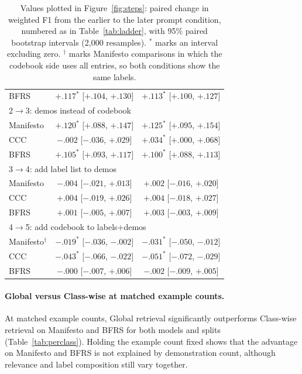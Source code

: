 \documentclass[11pt]{article}
\begin{document}
\begin{table}[!htp]
\begin{tabular}{lcc}
\quad BFRS & $+.117^*$ [$+.104$, $+.130$] & $+.113^*$ [$+.100$, $+.127$] \\
\multicolumn{3}{l}{2$\rightarrow$3: demos instead of codebook} \\
\quad Manifesto & $+.120^*$ [$+.088$, $+.147$] & $+.125^*$ [$+.095$, $+.154$] \\
\quad CCC & $-.002$ [$-.036$, $+.029$] & $+.034^*$ [$+.000$, $+.068$] \\
\quad BFRS & $+.105^*$ [$+.093$, $+.117$] & $+.100^*$ [$+.088$, $+.113$] \\
\multicolumn{3}{l}{3$\rightarrow$4: add label list to demos} \\
\quad Manifesto & $-.004$ [$-.021$, $+.013$] & $+.002$ [$-.016$, $+.020$] \\
\quad CCC & $+.004$ [$-.019$, $+.026$] & $+.004$ [$-.018$, $+.027$] \\
\quad BFRS & $+.001$ [$-.005$, $+.007$] & $+.003$ [$-.003$, $+.009$] \\
\multicolumn{3}{l}{4$\rightarrow$5: add codebook to labels+demos} \\
\quad Manifesto$^\dagger$ & $-.019^*$ [$-.036$, $-.002$] & $-.031^*$ [$-.050$, $-.012$] \\
\quad CCC & $-.043^*$ [$-.066$, $-.022$] & $-.051^*$ [$-.072$, $-.029$] \\
\quad BFRS & $-.000$ [$-.007$, $+.006$] & $-.002$ [$-.009$, $+.005$] \\
\bottomrule
\end{tabular}
\caption{Values plotted in Figure~\ref{fig:steps}: paired change in weighted F1 from the earlier to the later prompt condition, numbered as in Table~\ref{tab:ladder}, with 95\% paired bootstrap intervals (2,000 resamples). $^*$ marks an interval excluding zero. $^\dagger$ marks Manifesto comparisons in which the codebook side uses all entries, so both conditions show the same labels.}
\label{tab:steps}
\end{table}

\newpage

\paragraph{Global versus Class-wise at matched example counts.}
At matched example counts, Global retrieval significantly outperforms Class-wise retrieval on Manifesto and BFRS for both models and splits (Table~\ref{tab:perclass}). Holding the example count fixed shows that the advantage on Manifesto and BFRS is not explained by demonstration count, although relevance and label composition still vary together.
\end{document}
